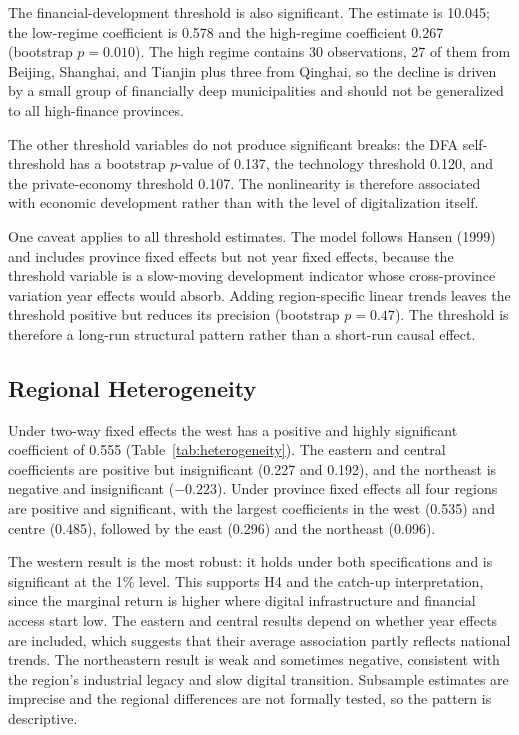 The financial-development threshold is also significant. The estimate is 10.045; the low-regime coefficient is 0.578 and the high-regime coefficient 0.267 (bootstrap $p=0.010$). The high regime contains 30 observations, 27 of them from Beijing, Shanghai, and Tianjin plus three from Qinghai, so the decline is driven by a small group of financially deep municipalities and should not be generalized to all high-finance provinces.

The other threshold variables do not produce significant breaks: the DFA self-threshold has a bootstrap $p$-value of 0.137, the technology threshold 0.120, and the private-economy threshold 0.107. The nonlinearity is therefore associated with economic development rather than with the level of digitalization itself.

One caveat applies to all threshold estimates. The model follows Hansen (1999) and includes province fixed effects but not year fixed effects, because the threshold variable is a slow-moving development indicator whose cross-province variation year effects would absorb. Adding region-specific linear trends leaves the threshold positive but reduces its precision (bootstrap $p=0.47$). The threshold is therefore a long-run structural pattern rather than a short-run causal effect.

\subsection{Regional Heterogeneity}\label{sec:heterogeneity}

Under two-way fixed effects the west has a positive and highly significant coefficient of 0.555 (Table~\ref{tab:heterogeneity}). The eastern and central coefficients are positive but insignificant (0.227 and 0.192), and the northeast is negative and insignificant ($-0.223$). Under province fixed effects all four regions are positive and significant, with the largest coefficients in the west (0.535) and centre (0.485), followed by the east (0.296) and the northeast (0.096).

The western result is the most robust: it holds under both specifications and is significant at the 1\% level. This supports H4 and the catch-up interpretation, since the marginal return is higher where digital infrastructure and financial access start low. The eastern and central results depend on whether year effects are included, which suggests that their average association partly reflects national trends. The northeastern result is weak and sometimes negative, consistent with the region's industrial legacy and slow digital transition. Subsample estimates are imprecise and the regional differences are not formally tested, so the pattern is descriptive.

